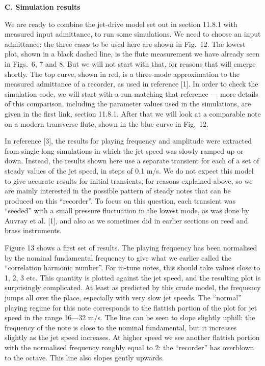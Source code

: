 
  \textbf{C. Simulation results} 

  We are ready to combine the jet-drive model set out in section 11.8.1 with 
  measured input admittance, to run some simulations. We need to choose an 
  input admittance: the three cases to be used here are shown in Fig.\ 12. The 
  lowest plot, shown in a black dashed line, is the flute measurement we have 
  already seen in Figs.\ 6, 7 and 8. But we will not start with that, for 
  reasons that will emerge shortly. The top curve, shown in red, is a 
  three-mode approximation to the measured admittance of a recorder, as used in 
  reference [1]. In order to check the simulation code, we will start with a 
  run matching that reference --- more details of this comparison, including 
  the parameter values used in the simulations, are given in the first link, 
  section 11.8.1. After that we will look at a comparable note on a modern 
  transverse flute, shown in the blue curve in Fig.\ 12. 

  In reference [3], the results for playing frequency and amplitude were 
  extracted from single long simulations in which the jet speed was slowly 
  ramped up or down. Instead, the results shown here use a separate transient 
  for each of a set of steady values of the jet speed, in steps of 0.1 m/s. We 
  do not expect this model to give accurate results for initial transients, for 
  reasons explained above, so we are mainly interested in the possible pattern 
  of steady notes that can be produced on this ``recorder''. To focus on this 
  question, each transient was “seeded” with a small pressure fluctuation in 
  the lowest mode, as was done by Auvray et al. [1], and also as we sometimes 
  did in earlier sections on reed and brass instruments. 

  Figure 13 shows a first set of results. The playing frequency has been 
  normalised by the nominal fundamental frequency to give what we earlier 
  called the “correlation harmonic number”. For in-tune notes, this should take 
  values close to 1, 2, 3 etc. This quantity is plotted against the jet speed, 
  and the resulting plot is surprisingly complicated. At least as predicted by 
  this crude model, the frequency jumps all over the place, especially with 
  very slow jet speeds. The “normal” playing regime for this note corresponds 
  to the flattish portion of the plot for jet speed in the range 16—32 m/s. The 
  line can be seen to slope slightly uphill: the frequency of the note is close 
  to the nominal fundamental, but it increases slightly as the jet speed 
  increases. At higher speed we see another flattish portion with the 
  normalised frequency roughly equal to 2: the “recorder” has overblown to the 
  octave. This line also slopes gently upwards. 

